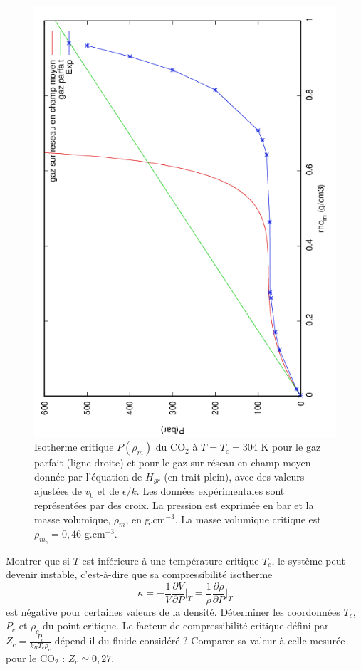 \documentclass[utf8, 11pt]{feuille}
\begin{document}
\begin{figure}[h!]
  \centering
  \includegraphics[scale=.7,angle=-90]{co2}
  \caption{Isotherme critique $P(\rho_m)$ du CO$_2$ à $T=T_c=304$ K
    pour le gaz parfait (ligne droite) et pour le gaz sur réseau en
    champ moyen donnée par l'équation de $H_{gr}$ (en trait
    plein), avec des valeurs ajustées de $v_0$ et de $\epsilon/k$. Les données expérimentales
    sont représentées par des croix. La pression est exprimée en bar
    et la masse volumique, $\rho_m$, en g.cm$^{-3}$. La masse
    volumique critique est $\rho_{m_{c}}=0,46$ g.cm$^{-3}$.}
\end{figure}


\question
Montrer que si $T$ est inférieure à une température critique $T_c$, le système peut devenir instable, c'est-à-dire que sa compressibilité isotherme
$$
\kappa =-\frac{1}{V} \frac{\partial V}{\partial P}\bigg|_T= \frac{1}{\rho} \frac{\partial \rho}{\partial P}\bigg|_T
$$
est négative pour certaines valeurs de la densité.  Déterminer les coordonnées $T_c$, $P_c$ et $\rho_c$ du point critique. Le facteur de compressibilité critique défini par $\displaystyle Z_c=\frac{P_c}{k_BT_c\rho_c}$ dépend-il du fluide considéré ? Comparer sa valeur à celle mesurée pour le CO$_2$ : $Z_c\simeq 0,27$.
\end{document}
